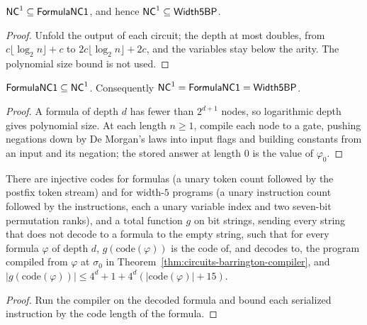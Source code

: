 \begin{theorem}
  \label{thm:circuits-nc1-subset-width5bp}
  \leanok
  $\mathsf{NC}^1 \subseteq \mathsf{FormulaNC1}$, and hence
  $\mathsf{NC}^1 \subseteq \mathsf{Width5BP}$.
\end{theorem}
\begin{proof}
  \leanok
  Unfold the output of each circuit; the depth at most doubles, from
  $c \lfloor \log_2 n \rfloor + c$ to
  $2c \lfloor \log_2 n \rfloor + 2c$, and the variables stay below the arity.
  The polynomial size bound is not used.
\end{proof}

\begin{theorem}
  \label{thm:circuits-formula-nc1-subset-nc1}
  $\mathsf{FormulaNC1} \subseteq \mathsf{NC}^1$. Consequently
  $\mathsf{NC}^1 = \mathsf{FormulaNC1} = \mathsf{Width5BP}$.
\end{theorem}
\begin{proof}
  A formula of depth $d$ has fewer than $2^{d+1}$ nodes, so logarithmic depth
  gives polynomial size. At each length $n \ge 1$, compile each node to a
  gate, pushing negations down by De Morgan's laws into input flags and
  building constants from an input and its negation; the stored answer at
  length $0$ is the value of $\varphi_0$.
\end{proof}

\begin{lemma}
  \label{lem:circuits-barrington-codegen}
  \leanok
  There are injective codes for formulas (a unary token count followed by the
  postfix token stream) and for width-$5$ programs (a unary instruction count
  followed by the instructions, each a unary variable index and two seven-bit
  permutation ranks), and a total function $g$ on bit strings, sending every
  string that does not decode to a formula to the empty string, such that for
  every formula $\varphi$ of depth $d$, $g(\mathrm{code}(\varphi))$ is the
  code of, and decodes to, the program compiled from $\varphi$ at $\sigma_0$
  in Theorem~\ref{thm:circuits-barrington-compiler}, and
  $|g(\mathrm{code}(\varphi))| \le 4^d + 1 + 4^d (|\mathrm{code}(\varphi)| + 15)$.
\end{lemma}
\begin{proof}
  \leanok
  Run the compiler on the decoded formula and bound each serialized
  instruction by the code length of the formula.
\end{proof}

